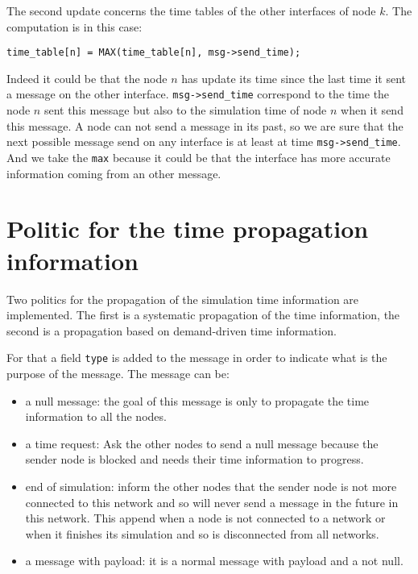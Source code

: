 The second update concerns the time tables of the other interfaces of node $k$. The computation is
in this case:
\begin{verbatim}
time_table[n] = MAX(time_table[n], msg->send_time);
\end{verbatim}
Indeed it could be that the node $n$ has update its time since the last time it
sent a message on the other interface. \verb|msg->send_time| correspond to the time
the node $n$ sent this message but also to the simulation time of node $n$ when it
send this message. 
A node can not send a message in its past, so we are sure that the next possible
message send on any interface is at least at time \verb|msg->send_time|.
And we take the \verb|max| because it could be that the interface has more
accurate information coming from an other message.



\section{Politic for the time propagation information}

Two politics for the propagation of the simulation time information are implemented.
The first is a systematic propagation of the time information, 
the second is a propagation based on demand-driven time information.

For that a field \verb|type| is added to the message in order to indicate what is
the purpose of the message. The message can be:
\begin{itemize}
    \item a null message: the goal of this message is only to propagate the time information
    to all the nodes.
    \item a time request: Ask the other nodes to send a null message because
    the sender node is blocked and needs their time information to progress.
    \item end of simulation: inform the other nodes that the sender node is not more
    connected to this network and so will never send a message in the future in this
    network. This append when a node is not connected to a network or when it finishes
    its simulation and so is disconnected from all networks.
    \item a message with payload: it is a normal message with payload and a 
    not null.
\end{itemize}

